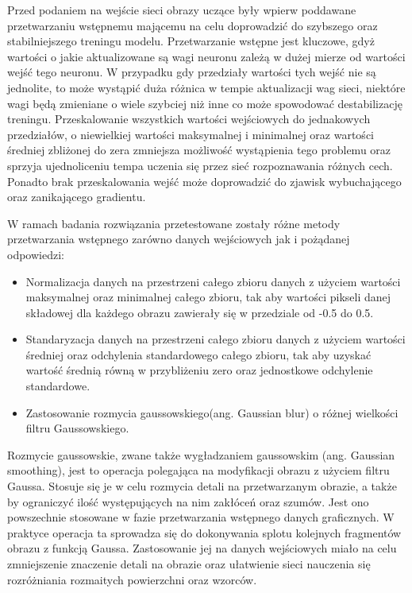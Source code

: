   Przed podaniem na wejście sieci obrazy uczące były wpierw poddawane
  przetwarzaniu wstępnemu mającemu na celu doprowadzić do szybszego oraz
  stabilniejszego treningu modelu. Przetwarzanie wstępne jest kluczowe, gdyż
  wartości o jakie aktualizowane są wagi neuronu zależą w dużej mierze od
  wartości wejść tego neuronu. W przypadku gdy przedziały wartości tych wejść
  nie są jednolite, to może wystąpić duża różnica w tempie aktualizacji wag
  sieci, niektóre wagi będą zmieniane o wiele szybciej niż inne co może spowodować
  destabilizację treningu. Przeskalowanie wszystkich wartości wejściowych do jednakowych
  przedziałów, o niewielkiej wartości maksymalnej i minimalnej oraz wartości
  średniej zbliżonej do zera zmniejsza możliwość wystąpienia tego problemu
  oraz sprzyja ujednoliceniu tempa uczenia się przez sieć rozpoznawania różnych cech.
  Ponadto brak przeskalowania wejść może doprowadzić do zjawisk wybuchającego
  oraz zanikającego gradientu.

  \noindent
  W ramach badania rozwiązania przetestowane zostały różne metody przetwarzania
  wstępnego zarówno danych wejściowych jak i pożądanej odpowiedzi:
  \begin{itemize}
  \item Normalizacja danych na przestrzeni całego zbioru danych z użyciem wartości
  maksymalnej oraz minimalnej całego zbioru, tak aby wartości pikseli danej składowej
  dla każdego obrazu zawierały się w przedziale od -0.5 do 0.5.
  \item Standaryzacja danych na przestrzeni całego zbioru danych z użyciem wartości
  średniej oraz odchylenia standardowego całego zbioru, tak aby uzyskać wartość
  średnią równą w przybliżeniu zero oraz jednostkowe odchylenie standardowe.
  \item Zastosowanie rozmycia gaussowskiego(ang. Gaussian blur) o różnej
  wielkości filtru Gaussowskiego.
  \end{itemize}

  Rozmycie gaussowskie, zwane także wygładzaniem gaussowskim (ang. Gaussian smoothing),
  jest to operacja polegająca na modyfikacji obrazu z użyciem filtru Gaussa.
  Stosuje się je w celu rozmycia detali na przetwarzanym obrazie, a także by
  ograniczyć ilość występujących na nim zakłóceń oraz szumów. Jest ono powszechnie
  stosowane w fazie przetwarzania wstępnego danych graficznych. W praktyce
  operacja ta sprowadza się do dokonywania splotu kolejnych fragmentów obrazu
  z funkcją Gaussa. Zastosowanie jej na danych wejściowych miało na celu
  zmniejszenie znaczenie detali na obrazie oraz ułatwienie sieci nauczenia się
  rozróżniania rozmaitych powierzchni oraz wzorców.

